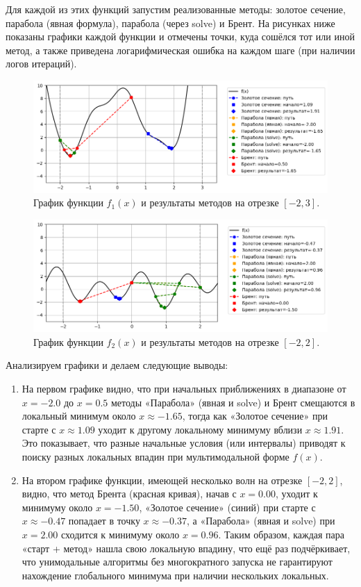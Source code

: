 \documentclass[a4paper,12pt]{article}
\begin{document}
Для каждой из этих функций запустим реализованные методы: золотое сечение, парабола (явная формула), парабола (через solve) и Брент. На рисунках ниже показаны графики каждой функции и отмечены точки, куда сошёлся тот или иной метод, а также приведена логарифмическая ошибка на каждом шаге (при наличии логов итераций).

\begin{figure}[H]
    \centering
    \includegraphics[width=\textwidth]{images/task1/multifunc_1.png}
    \caption{График функции $f_1(x)$ и результаты методов на отрезке $[-2,3]$.}
\end{figure}

\begin{figure}[H]
    \centering
    \includegraphics[width=\textwidth]{images/task1/multifunc_2.png}
    \caption{График функции $f_2(x)$ и результаты методов на отрезке $[-2,2]$.}
\end{figure}
Анализируем графики и делаем следующие выводы:
\begin{enumerate}
    \item На первом графике видно, что при начальных приближениях в диапазоне от $x=-2.0$ до $x=0.5$ методы «Парабола» (явная и solve) и Брент смещаются в локальный минимум около $x\approx -1.65$, тогда как «Золотое сечение» при старте с $x\approx1.09$ уходит к другому локальному минимуму вблизи $x\approx1.91$. Это показывает, что разные начальные условия (или интервалы) приводят к поиску разных локальных впадин при мультимодальной форме $f(x)$.
    \item На втором графике функции, имеющей несколько волн на отрезке $[-2,2]$, видно, что метод Брента (красная кривая), начав с $x=0.00$, уходит к минимуму около $x=-1.50$, «Золотое сечение» (синий) при старте с $x\approx-0.47$ попадает в точку $x\approx-0.37$, а «Парабола» (явная и solve) при $x=2.00$ сходится к минимуму около $x=0.96$. Таким образом, каждая пара «старт + метод» нашла свою локальную впадину, что ещё раз подчёркивает, что унимодальные алгоритмы без многократного запуска не гарантируют нахождение глобального минимума при наличии нескольких локальных.
\end{enumerate}
\end{document}
